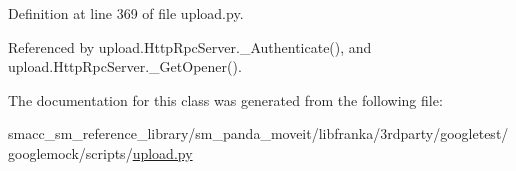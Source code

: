 Definition at line 369 of file upload.\+py.



Referenced by upload.\+Http\+Rpc\+Server.\+\_\+\+Authenticate(), and upload.\+Http\+Rpc\+Server.\+\_\+\+Get\+Opener().



The documentation for this class was generated from the following file\+:\begin{DoxyCompactItemize}
\item 
smacc\+\_\+sm\+\_\+reference\+\_\+library/sm\+\_\+panda\+\_\+moveit/libfranka/3rdparty/googletest/googlemock/scripts/\hyperlink{googlemock_2scripts_2upload_8py}{upload.\+py}\end{DoxyCompactItemize}
